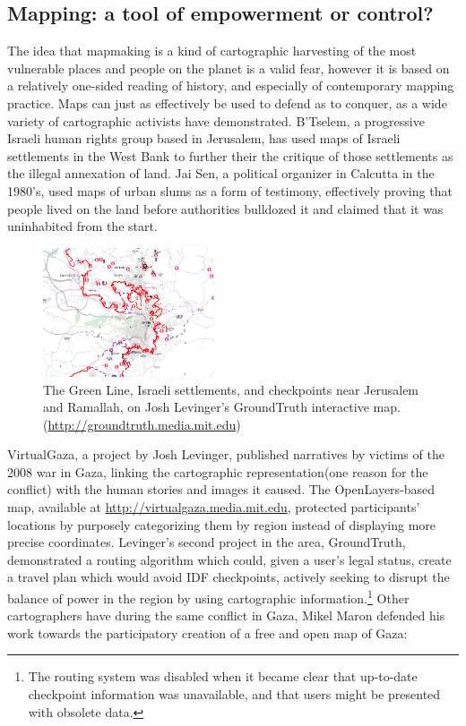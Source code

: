 \documentclass[11pt,oneside,notitlepage]{report}
\begin{document}
\subsection{Mapping: a tool of empowerment or control?}

The idea that mapmaking is a kind of cartographic harvesting of the most vulnerable places and people on the planet is a valid fear, however it is based on a relatively one-sided reading of history, and especially of contemporary mapping practice. Maps can just as effectively be used to defend as to conquer, as a wide variety of cartographic activists have demonstrated. B'Tselem, a progressive Israeli human rights group based in Jerusalem, has used maps of Israeli settlements in the West Bank to further their the critique of those settlements as the illegal annexation of land. Jai Sen, a political organizer in Calcutta in the 1980's, used maps of urban slums as a form of testimony, effectively proving that people lived on the land before authorities bulldozed it and claimed that it was uninhabited from the start. 

\begin{figure}
	\begin{flushright}
		\includegraphics[width=0.45\textwidth]{images/levinger-groundtruth.png}
		\caption{The Green Line, Israeli settlements, and checkpoints near Jerusalem and Ramallah, on Josh Levinger's GroundTruth interactive map. (\url{http://groundtruth.media.mit.edu})}
	\end{flushright}
\end{figure}

VirtualGaza, a project by Josh Levinger, published narratives by victims of the 2008 war in Gaza, linking the cartographic representation(one reason for the conflict) with the human stories and images it caused. The OpenLayers-based map, available at \url{http://virtualgaza.media.mit.edu}, protected participants' locations by purposely categorizing them by region instead of displaying more precise coordinates. Levinger's second project in the area, GroundTruth, demonstrated a routing algorithm which could, given a user's legal status, create a travel plan which would avoid IDF checkpoints, actively seeking to disrupt the balance of power in the region by using cartographic information.\footnote{The routing system was disabled when it became clear that up-to-date checkpoint information was unavailable, and that users might be presented with obsolete data.} Other cartographers have during the same conflict in Gaza, Mikel Maron defended his work towards the participatory creation of a free and open map of Gaza:  
\end{document}
